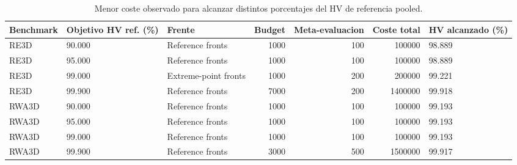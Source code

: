 \documentclass[11pt,a4paper]{article}
\begin{document}
{\scriptsize
\begin{table}[p]
\centering
\caption{Menor coste observado para alcanzar distintos porcentajes del HV de referencia pooled.}
\label{tab:cost_quality}
\begin{tabular}{lllrrrl}
\toprule
Benchmark & Objetivo HV ref. (\%) & Frente & Budget & Meta-evaluacion & Coste total & HV alcanzado (\%) \\
\midrule
RE3D & 90.000 & Reference fronts & 1000 & 100 & 100000 & 98.889 \\
RE3D & 95.000 & Reference fronts & 1000 & 100 & 100000 & 98.889 \\
RE3D & 99.000 & Extreme-point fronts & 1000 & 200 & 200000 & 99.221 \\
RE3D & 99.900 & Reference fronts & 7000 & 200 & 1400000 & 99.918 \\
RWA3D & 90.000 & Reference fronts & 1000 & 100 & 100000 & 99.193 \\
RWA3D & 95.000 & Reference fronts & 1000 & 100 & 100000 & 99.193 \\
RWA3D & 99.000 & Reference fronts & 1000 & 100 & 100000 & 99.193 \\
RWA3D & 99.900 & Reference fronts & 3000 & 500 & 1500000 & 99.917 \\
\bottomrule
\end{tabular}
\end{table}

}
\end{document}
